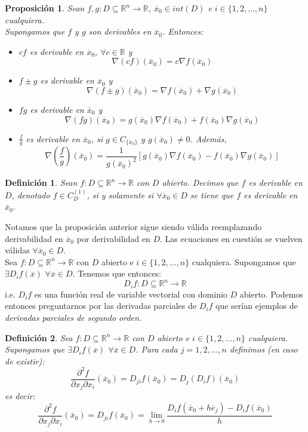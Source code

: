 \documentclass[11pt]{report}
\newtheorem{definition}{Definición}[section]
\newtheorem{proposition}{Proposición}[section]
\newcommand{\Rn}{\mathbb{R}^{n}}
\newcommand{\R}{\mathbb{R}}
\newcommand{\ev}{\overline{e}}
\newcommand{\x}{\overline{x}}
\newcommand{\xz}{\overline{x}_{0}}
\newcommand{\Sn}{1,2,\ldots, n}
\newcommand{\fxi}{D_{i}f}
\begin{document}
\begin{proposition}
Sean $f,g:D\subseteq\Rn\rightarrow\R$, $\xz\in int(D)$ e $i\in\{1,2,\ldots,n\}$ cualquiera.\\
Supongamos que $f$ y $g$ son derivables en $\xz$. Entonces:
\begin{itemize}
\item[(i)] $cf$ es derivable en $\xz$, $\forall c\in\R$ y
$$\nabla(cf)(\xz)=c\nabla f(\xz)$$
\item[(ii)] $f\pm g$ es derivable en $\xz$ y
$$\nabla(f\pm g)(\xz)=\nabla f(\xz)+\nabla g(\xz)$$
\item[(iii)] $fg$ es derivable en $\xz$ y
$$\nabla (fg)(\xz)=g(\xz)\nabla f(\xz)+f(\xz)\nabla g(\xz)$$
\item[(iv)] $\frac{f}{g}$ es derivable en $\xz$, si $g\in C_{\{\xz\}}$ y $g(\xz)\ne0$. Además,
$$\nabla\left(\frac{f}{g}\right)(\xz)=\frac{1}{g(\xz)^{2}}[g(\xz)\nabla f(\xz)-f(\xz)\nabla g(\xz)]$$
\end{itemize}
\end{proposition}

\begin{definition} Sean $f:D\subseteq\Rn\rightarrow\R$ con $D$ abierto. Decimos que $f$ es derivable en $D$, denotado $f\in C_{D}^{(1)}$, si y solamente si $\forall\xz\in D$ se tiene que $f$ es derivable en $\xz$.
\end{definition}
Notamos que la proposición anterior sigue siendo válida reemplazando derivabilidad en $\xz$ por derivabilidad en $D$. Las ecuaciones en cuestión se vuelven válidas $\forall\xz\in D$.\\


Sea $f:D\subseteq\Rn\rightarrow\R$ con $D$ abierto e $i\in\{1, 2, \ldots, n\}$ cualquiera. Supongamos que $\exists\fxi(\x)$ $\forall \x\in D$. Tenemos que entonces:
$$\fxi:D\subseteq\Rn\rightarrow\R$$
i.e. $\fxi$ es una función real de variable vectorial con dominio $D$ abierto. Podemos entonces preguntarnos por las derivadas parciales de $\fxi$ que serían ejemplos de \emph{derivadas parciales de segundo orden.}

\begin{definition}
Sea $f:D\subseteq\Rn\rightarrow\R$ con $D$ abierto e $i\in\{1, 2, \ldots, n\}$ cualquiera. Supongamos que $\exists\fxi(\x)$ $\forall \x\in D$. Para cada $j=\Sn$ definimos (en caso de existir):
$$\frac{\partial^{2}f}{\partial x_{j}\partial x_{i}}(\xz)=D_{ji}f(\xz)=D_{j}(\fxi)(\xz)$$
es decir:
$$\frac{\partial^{2}f}{\partial x_{j}\partial x_{i}}(\xz)=D_{ji}f(\xz)=\lim_{h\to0}\frac{\fxi(\xz+h\ev_{j})-\fxi(\xz)}{h}$$
\end{definition}
\end{document}
